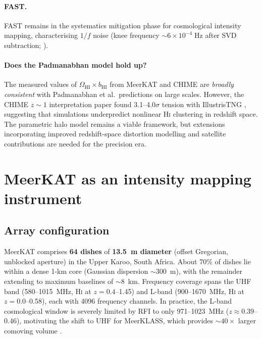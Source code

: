 \documentclass[10pt,a4paper]{article}
\newcommand{\OmHI}{\Omega_{\mathrm{HI}}}
\newcommand{\bHI}{b_{\mathrm{HI}}}
\begin{document}
\paragraph{FAST.}
FAST remains in the systematics mitigation phase for cosmological intensity
mapping, characterising $1/f$ noise (knee frequency
$\sim\!6 \times 10^{-4}\;\mathrm{Hz}$ after SVD subtraction;
\citealt{Hu2021}).

\paragraph{Does the Padmanabhan model hold up?}
The measured values of $\OmHI \times \bHI$ from MeerKAT and CHIME are
\emph{broadly consistent} with Padmanabhan et al.\ predictions on large
scales.  However, the CHIME $z \sim 1$ interpretation paper found
3.1--4.0$\sigma$ tension with IllustrisTNG \citep{CHIME2026}, suggesting that
simulations underpredict nonlinear H\textsc{i} clustering in redshift space.
The parametric halo model remains a viable framework, but extensions
incorporating improved redshift-space distortion modelling and satellite
contributions are needed for the precision era.


\section{MeerKAT as an intensity mapping instrument}
\label{sec:MeerKAT}

\subsection{Array configuration}

MeerKAT comprises \textbf{64 dishes} of \textbf{13.5~m diameter}
(offset Gregorian, unblocked aperture) in the Upper Karoo, South Africa.
About 70\% of dishes lie within a dense 1-km core (Gaussian dispersion
$\sim\!300$~m), with the remainder extending to maximum baselines of
$\sim\!8$~km.  Frequency coverage spans the UHF band (580--1015~MHz,
H\textsc{i} at $z = 0.4$--1.45) and L-band (900--1670~MHz, H\textsc{i} at
$z = 0.0$--0.58), each with 4096 frequency channels.  In practice, the L-band
cosmological window is severely limited by RFI to only 971--1023~MHz
($z \approx 0.39$--0.46), motivating the shift to UHF for MeerKLASS, which
provides $\sim\!40\times$ larger comoving volume \citep{Cunnington2025}.
\end{document}
